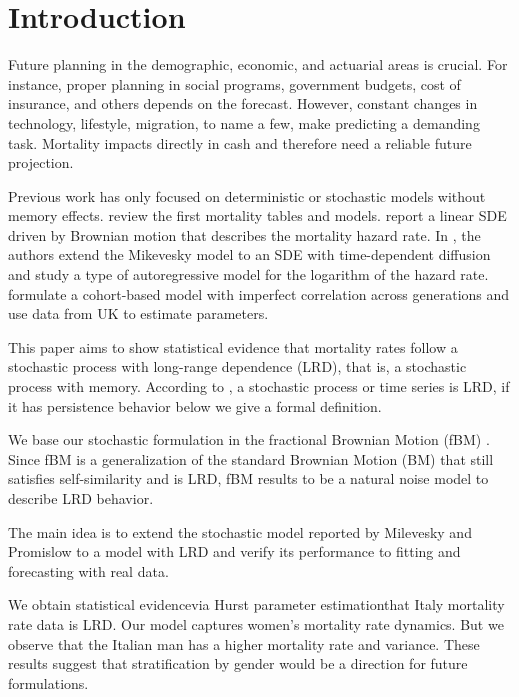 \documentclass[smallextended]{svjour3}
\begin{document}
\section{Introduction} \label{intro}

        Future planning in the demographic, economic, and actuarial areas is
    crucial. For instance, proper planning in social programs, government
    budgets, cost of insurance, and others depends on the forecast. However,
    constant changes in technology, lifestyle, migration, to name a few, make
    predicting a demanding task.  Mortality impacts directly in cash and
    therefore need a reliable future projection.

        Previous work has only focused on deterministic or stochastic models
    without memory effects. \cite{pitacco2009modelling} review 
    the first mortality tables and models.
    \cite{mi-pr} report a linear SDE driven by Brownian motion that describes
    the mortality hazard rate. In \cite{gi-or-be}, the authors extend the
    Mikevesky model to an SDE with time-dependent diffusion and study a type of
    autoregressive model for the logarithm of the hazard rate.   
    \cite{je-lu-vi} formulate a cohort-based model with imperfect correlation
    across generations and use data from UK to estimate parameters.

        This paper aims to show statistical evidence that mortality rates
    follow a stochastic process with long-range dependence (LRD), that is,
    a stochastic process with memory. According to \cite{ra}, a stochastic
    process or time series is LRD, if it has persistence behavior\textemdash
    below we give a formal definition.

        We base our stochastic formulation in the fractional Brownian Motion 
    (fBM) \citep[see ]{ma-va}. Since fBM is a generalization of the standard 
    Brownian Motion (BM) that still satisfies self-similarity and is LRD, fBM 
    results to be a natural noise model to describe LRD behavior.

        The main idea is to extend the stochastic model reported by 
    Milevesky and Promislow to a model with LRD and verify its performance 
    to fitting and forecasting with real data.  

        We obtain statistical evidence\textemdash via Hurst parameter 
    estimation\textemdash that Italy mortality rate data is LRD. Our model 
    captures women's mortality rate dynamics. But we observe that the Italian
    man has a higher mortality rate and variance. These results suggest 
    that stratification by gender would be a direction for future formulations.
   
\end{document}

